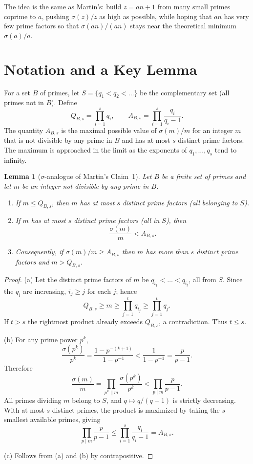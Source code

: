 \documentclass[12pt]{amsart}
\newtheorem{lemma}{Lemma}[section]
\theoremstyle{definition}
\begin{document}
The idea is the same as Martin's: build $z = an+1$ from many small primes
coprime to $a$, pushing $\sigma(z)/z$ as high as possible, while hoping that
$an$ has very few prime factors so that $\sigma(an)/(an)$ stays near the
theoretical minimum $\sigma(a)/a$.

\section{Notation and a Key Lemma}

For a set $B$ of primes, let $S = \{q_1 < q_2 < \dots\}$ be the complementary
set (all primes not in $B$).  Define
\begin{equation}\label{eq:QAB}
Q_{B,s} = \prod_{i=1}^{s} q_i, \qquad
A_{B,s} = \prod_{i=1}^{s} \frac{q_i}{q_i-1}.
\end{equation}
The quantity $A_{B,s}$ is the maximal possible value of $\sigma(m)/m$ for
an integer $m$ that is not divisible by any prime in $B$ and has at most $s$
distinct prime factors.  The maximum is approached in the limit as the
exponents of $q_1,\dots,q_s$ tend to infinity.

\begin{lemma}[$\sigma$-analogue of Martin's Claim~1]\label{lem:main}
Let $B$ be a finite set of primes and let $m$ be an integer not divisible by
any prime in $B$.
\begin{enumerate}
  \item[(a)] If $m \le Q_{B,s}$, then $m$ has at most $s$ distinct prime
             factors (all belonging to $S$).
  \item[(b)] If $m$ has at most $s$ distinct prime factors (all in $S$), then
             \[ \frac{\sigma(m)}{m} < A_{B,s}. \]
  \item[(c)] Consequently, if $\sigma(m)/m \ge A_{B,s}$ then $m$ has more than
             $s$ distinct prime factors and $m > Q_{B,s}$.
\end{enumerate}
\end{lemma}

\begin{proof}
(a) Let the distinct prime factors of $m$ be $q_{i_1} < \dots < q_{i_t}$, all
from $S$.  Since the $q_i$ are increasing, $i_j \ge j$ for each $j$; hence
\[
Q_{B,s} \ge m \ge \prod_{j=1}^{t} q_{i_j} \ge \prod_{j=1}^{t} q_j .
\]
If $t > s$ the rightmost product already exceeds $Q_{B,s}$, a contradiction.
Thus $t \le s$.

(b) For any prime power $p^{k}$,
\[
\frac{\sigma(p^{k})}{p^{k}}
= \frac{1 - p^{-(k+1)}}{1 - p^{-1}}
< \frac{1}{1 - p^{-1}}
= \frac{p}{p-1}.
\]
Therefore
\[
\frac{\sigma(m)}{m}
= \prod_{p^{k} \parallel m} \frac{\sigma(p^{k})}{p^{k}}
< \prod_{p \mid m} \frac{p}{p-1}.
\]
All primes dividing $m$ belong to $S$, and $q \mapsto q/(q-1)$ is strictly
decreasing.  With at most $s$ distinct primes, the product is maximized by
taking the $s$ smallest available primes, giving
\[
\prod_{p \mid m} \frac{p}{p-1}
\le \prod_{i=1}^{s} \frac{q_i}{q_i-1}
= A_{B,s}.
\]

(c) Follows from (a) and (b) by contrapositive.
\end{proof}
\end{document}
